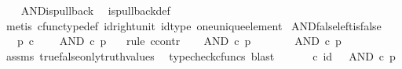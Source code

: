 \begin{isabellebody}
\ \ %
\endisadelimproof
%
\isatagproof
{}\isamarkupfalse%
\ AND{\isacharunderscore}{\kern0pt}is{\isacharunderscore}{\kern0pt}pullback\ \isamarkupfalse%
\ is{\isacharunderscore}{\kern0pt}pullback{\isacharunderscore}{\kern0pt}def\isanewline
\ \ \isamarkupfalse%
\ {\isacharparenleft}{\kern0pt}metis\ cfunc{\isacharunderscore}{\kern0pt}type{\isacharunderscore}{\kern0pt}def\ id{\isacharunderscore}{\kern0pt}right{\isacharunderscore}{\kern0pt}unit\ id{\isacharunderscore}{\kern0pt}type\ one{\isacharunderscore}{\kern0pt}unique{\isacharunderscore}{\kern0pt}element{\isacharparenright}{\kern0pt}%
\endisatagproof
{\isafoldproof}%
%
\isadelimproof
\isanewline
%
\endisadelimproof
\isanewline
{}\isamarkupfalse%
\ AND{\isacharunderscore}{\kern0pt}false{\isacharunderscore}{\kern0pt}left{\isacharunderscore}{\kern0pt}is{\isacharunderscore}{\kern0pt}false{\isacharcolon}{\kern0pt}\isanewline
\ \ \ {\isachardoublequoteopen}p\ {\isasymin}\isactrlsub c\ {\isasymOmega}{\isachardoublequoteclose}\isanewline
\ \ \ {\isachardoublequoteopen}AND\ {\isasymcirc}\isactrlsub c\ {\isasymlangle}{\isasymf}{\isacharcomma}{\kern0pt}p{\isasymrangle}\ {\isacharequal}{\kern0pt}\ {\isasymf}{\isachardoublequoteclose}\isanewline
%
\isadelimproof
%
\endisadelimproof
%
\isatagproof
{}\isamarkupfalse%
\ {\isacharparenleft}{\kern0pt}rule\ ccontr{\isacharparenright}{\kern0pt}\isanewline
\ \ \isamarkupfalse%
\ {\isachardoublequoteopen}AND\ {\isasymcirc}\isactrlsub c\ {\isasymlangle}{\isasymf}{\isacharcomma}{\kern0pt}p{\isasymrangle}\ {\isasymnoteq}\ {\isasymf}{\isachardoublequoteclose}\isanewline
\ \ \isamarkupfalse%
\ \isamarkupfalse%
\ {\isachardoublequoteopen}AND\ {\isasymcirc}\isactrlsub c\ {\isasymlangle}{\isasymf}{\isacharcomma}{\kern0pt}p{\isasymrangle}\ {\isacharequal}{\kern0pt}\ {\isasymt}{\isachardoublequoteclose}\isanewline
\ \ \ \ \isamarkupfalse%
\ assms\ true{\isacharunderscore}{\kern0pt}false{\isacharunderscore}{\kern0pt}only{\isacharunderscore}{\kern0pt}truth{\isacharunderscore}{\kern0pt}values\ \isamarkupfalse%
\ {\isacharparenleft}{\kern0pt}typecheck{\isacharunderscore}{\kern0pt}cfuncs{\isacharcomma}{\kern0pt}\ blast{\isacharparenright}{\kern0pt}\isanewline
\ \ \isamarkupfalse%
\ \isamarkupfalse%
\ {\isachardoublequoteopen}{\isasymt}\ {\isasymcirc}\isactrlsub c\ id\ {\isasymone}\ {\isacharequal}{\kern0pt}\ AND\ {\isasymcirc}\isactrlsub c\ {\isasymlangle}{\isasymf}{\isacharcomma}{\kern0pt}p{\isasymrangle}{\isachardoublequoteclose}\isanewline

\end{isabellebody}
